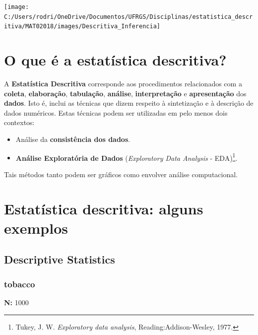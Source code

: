 \documentclass[]{tufte-book}
\providecommand{\tightlist}{%
  \setlength{\itemsep}{0pt}\setlength{\parskip}{0pt}}
\begin{document}
\begin{center}\texttt{[image: C:/Users/rodri/OneDrive/Documentos/UFRGS/Disciplinas/estatistica\_descritiva/MAT02018/images/Descritiva\_Inferencia]} \end{center}

\hypertarget{o-que-uxe9-a-estatuxedstica-descritiva}{%
\section{O que é a estatística
descritiva?}\label{o-que-uxe9-a-estatuxedstica-descritiva}}

A \textbf{Estatística Descritiva} corresponde aos procedimentos
relacionados com a \textbf{coleta}, \textbf{elaboração},
\textbf{tabulação}, \textbf{análise}, \textbf{interpretação} e
\textbf{apresentação} dos \textbf{dados}. Isto é, inclui as técnicas que
dizem respeito à sintetização e à descrição de dados numéricos. Estas
técnicas podem ser utilizadas em pelo menos dois contextos:

\begin{itemize}
\tightlist
\item
  Análise da \textbf{consistência dos dados}.
\item
  \textbf{Análise Exploratória de Dados} (\emph{Exploratory Data
  Analysis} - EDA)\footnote{Tukey, J. W. \emph{Exploratory data
    analysis}, Reading:Addison-Wesley, 1977.}.
\end{itemize}

Tais métodos tanto podem ser gráficos como envolver análise
computacional.

\hypertarget{estatuxedstica-descritiva-alguns-exemplos}{%
\section{Estatística descritiva: alguns
exemplos}\label{estatuxedstica-descritiva-alguns-exemplos}}

\hypertarget{descriptive-statistics}{%
\subsection{Descriptive Statistics}\label{descriptive-statistics}}

\hypertarget{tobacco}{%
\subsubsection{tobacco}\label{tobacco}}

\textbf{N:} 1000
\end{document}
